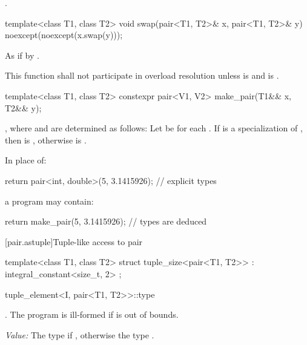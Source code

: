 \begin{itemdescr}
\pnum
\returns {}.
\end{itemdescr}


%
\begin{itemdecl}
template<class T1, class T2> void swap(pair<T1, T2>& x, pair<T1, T2>& y)
  noexcept(noexcept(x.swap(y)));
\end{itemdecl}

\begin{itemdescr}
\pnum
\effects As if by .

\pnum
\remarks
This function shall not participate in overload resolution unless
 is  and
 is .
\end{itemdescr}

%
\begin{itemdecl}
template<class T1, class T2>
  constexpr pair<V1, V2> make_pair(T1&& x, T2&& y);
\end{itemdecl}

\begin{itemdescr}
\pnum
\returns {},
where  and  are determined as follows: Let  be
 for each . If  is a specialization
of , then  is ,
otherwise  is .
\end{itemdescr}

\pnum
\begin{example}
In place of:
\begin{codeblock}
  return pair<int, double>(5, 3.1415926);   // explicit types
\end{codeblock}
a \Cpp{} program may contain:
\begin{codeblock}
  return make_pair(5, 3.1415926);           // types are deduced
\end{codeblock}
\end{example}

[pair.astuple]{Tuple-like access to pair}

%
\begin{itemdecl}
template<class T1, class T2>
  struct tuple_size<pair<T1, T2>> : integral_constant<size_t, 2> { };
\end{itemdecl}

%
\begin{itemdecl}
tuple_element<I, pair<T1, T2>>::type
\end{itemdecl}
\begin{itemdescr}
\pnum
\requires {}. The program is ill-formed if  is out of bounds.

\pnum
\textit{Value:} The type  if , otherwise the type .
\end{itemdescr}

